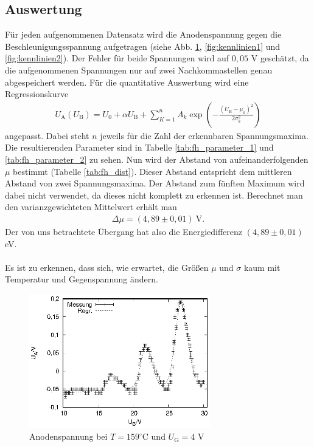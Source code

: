 \subsection{Auswertung}
Für jeden aufgenommenen Datensatz wird die Anodenspannung gegen die Beschleunigungsspannung aufgetragen (siehe Abb. \ref{fig:159K4V}, \ref{fig:kennlinien1} und \ref{fig:kennlinien2}). Der Fehler für beide Spannungen wird auf $0,05$ V geschätzt, da die aufgenommenen Spannungen nur auf zwei Nachkommastellen genau abgespeichert werden. Für die quantitative Auswertung wird eine Regressionskurve
\begin{align*}
  U_\mathrm{A}(U_\mathrm{B})=U_0+\alpha U_\mathrm{B}+\sum_{K=1}^nA_k\exp \left(-\frac{(U_\mathrm{B}-\mu_k)^2}{2\sigma_k^2} \right)
\end{align*}
angepasst. Dabei steht $n$ jeweils für die Zahl der erkennbaren Spannungsmaxima. Die resultierenden Parameter sind in Tabelle \ref{tab:fh_parameter_1} und \ref{tab:fh_parameter_2} zu sehen. Nun wird der Abstand von aufeinanderfolgenden $\mu$ bestimmt (Tabelle \ref{tab:fh_dist}). Dieser Abstand entspricht dem mittleren Abstand von zwei Spannungsmaxima. Der Abstand zum fünften Maximum wird dabei nicht verwendet, da dieses nicht komplett zu erkennen ist. Berechnet man den varianzgewichteten Mittelwert erhält man 
\begin{align*}
  \Delta \mu=(4,89 \pm 0,01)\mathrm{\ V.}
\end{align*}
Der von uns betrachtete Übergang hat also die Energiedifferenz $(4,89 \pm 0,01)$ eV. \\ \\
Es ist zu erkennen, dass sich, wie erwartet, die Größen $\mu$ und $\sigma$ kaum mit Temperatur und Gegenspannung ändern. 

\begin{figure}[h]
  \centering
  \includegraphics[width=0.7\textwidth]{data/fh/159K4V.eps}
  \caption{Anodenspannung bei $T=159^\circ$C und $U_\mathrm{G}=4$ V}
  \label{fig:159K4V}
\end{figure}


